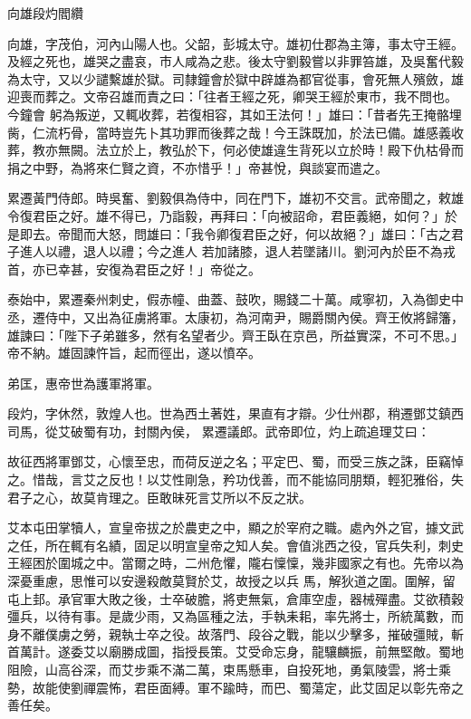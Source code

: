 
\begin{pinyinscope}

 向雄段灼閻纘



 向雄，字茂伯，河內山陽人也。父韶，彭城太守。雄初仕郡為主簿，事太守王經。及經之死也，雄哭之盡哀，市人咸為之悲。後太守劉毅嘗以非罪笞雄，及吳奮代毅為太守，又以少譴繫雄於獄。司隸鐘會於獄中辟雄為都官從事，會死無人殯斂，雄迎喪而葬之。文帝召雄而責之曰：「往者王經之死，卿哭王經於東市，我不問也。今鐘會
 躬為叛逆，又輒收葬，若復相容，其如王法何！」雄曰：「昔者先王掩骼埋胔，仁流朽骨，當時豈先卜其功罪而後葬之哉！今王誅既加，於法已備。雄感義收葬，教亦無闕。法立於上，教弘於下，何必使雄違生背死以立於時！殿下仇枯骨而捐之中野，為將來仁賢之資，不亦惜乎！」帝甚悅，與談宴而遣之。



 累遷黃門侍郎。時吳奮、劉毅俱為侍中，同在門下，雄初不交言。武帝聞之，敕雄令復君臣之好。雄不得已，乃詣毅，再拜曰：「向被詔命，君臣義絕，如何？」於是即去。帝聞而大怒，問雄曰：「我令卿復君臣之好，何以故絕？」雄曰：「古之君子進人以禮，退人以禮；今之進人
 若加諸膝，退人若墜諸川。劉河內於臣不為戎首，亦已幸甚，安復為君臣之好！」帝從之。



 泰始中，累遷秦州刺史，假赤幢、曲蓋、鼓吹，賜錢二十萬。咸寧初，入為御史中丞，遷侍中，又出為征虜將軍。太康初，為河南尹，賜爵關內侯。齊王攸將歸籓，雄諫曰：「陛下子弟雖多，然有名望者少。齊王臥在京邑，所益實深，不可不思。」帝不納。雄固諫忤旨，起而徑出，遂以憤卒。



 弟匡，惠帝世為護軍將軍。



 段灼，字休然，敦煌人也。世為西土著姓，果直有才辯。少仕州郡，稍遷鄧艾鎮西司馬，從艾破蜀有功，封關內侯，
 累遷議郎。武帝即位，灼上疏追理艾曰：



 故征西將軍鄧艾，心懷至忠，而荷反逆之名；平定巴、蜀，而受三族之誅，臣竊悼之。惜哉，言艾之反也！以艾性剛急，矜功伐善，而不能協同朋類，輕犯雅俗，失君子之心，故莫肯理之。臣敢昧死言艾所以不反之狀。



 艾本屯田掌犢人，宣皇帝拔之於農吏之中，顯之於宰府之職。處內外之官，據文武之任，所在輒有名績，固足以明宣皇帝之知人矣。會值洮西之役，官兵失利，刺史王經困於圍城之中。當爾之時，二州危懼，隴右懍懍，幾非國家之有也。先帝以為深憂重慮，思惟可以安邊殺敵莫賢於艾，故授之以兵
 馬，解狄道之圍。圍解，留屯上邽。承官軍大敗之後，士卒破膽，將吏無氣，倉庫空虛，器械殫盡。艾欲積穀彊兵，以待有事。是歲少雨，又為區種之法，手執耒耜，率先將士，所統萬數，而身不離僕虜之勞，親執士卒之役。故落門、段谷之戰，能以少擊多，摧破彊賊，斬首萬計。遂委艾以廟勝成圖，指授長策。艾受命忘身，龍驤麟振，前無堅敵。蜀地阻險，山高谷深，而艾步乘不滿二萬，束馬懸車，自投死地，勇氣陵雲，將士乘勢，故能使劉禪震怖，君臣面縛。軍不踰時，而巴、蜀蕩定，此艾固足以彰先帝之善任矣。




\end{pinyinscope}

